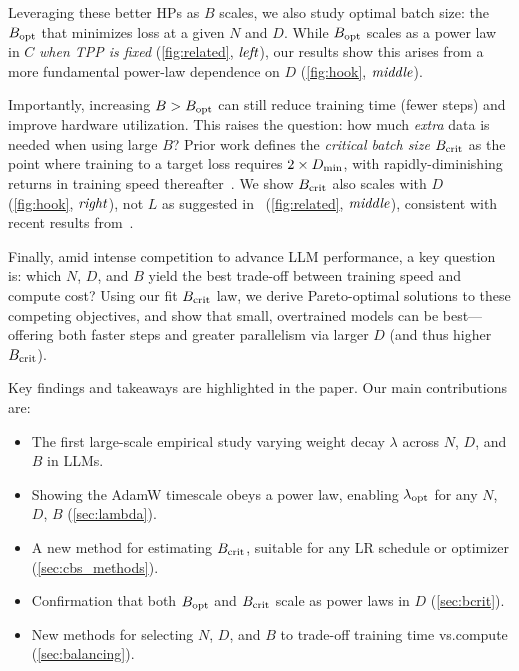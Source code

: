 Leveraging these better HPs as $B$ scales, we also study optimal batch
size: the $B_{\text{opt}}$ that minimizes loss at a given $N$ and $D$.
%
While $B_{\text{opt}}$ scales as a power law in $C$ \emph{when TPP is fixed}
(\cref{fig:related}, $\text{\emph{left}}$), our results show this arises from a
more fundamental power-law dependence on $D$ (\cref{fig:hook},
$\text{\emph{middle}}$).

Importantly, increasing $B > B_{\text{opt}}$ can still reduce training time
(fewer steps) and improve hardware utilization.
%
This raises the question: how much \emph{extra} data is needed when
using large $B$?
%
Prior work defines the \emph{critical batch size} $B_{\text{crit}}$ as the point
where training to a target loss requires $2 \times D_{\text{min}}$, with
rapidly-diminishing returns in training speed
thereafter~\citep{mccandlish2018empirical}.
%
We show $B_{\text{crit}}$ also scales with $D$ (\cref{fig:hook}, $\text{\emph{right}}$),
not $L$ as suggested in~\citet{kaplan2020scaling} (\cref{fig:related},
$\text{\emph{middle}}$), consistent with recent results
from~\citet{zhang2024how}.

Finally, amid intense competition to advance LLM performance, a key
question is: which $N$, $D$, and $B$ yield the best trade-off between
training speed and compute cost?
%
Using our fit $B_{\text{crit}}$ law, we derive Pareto-optimal solutions to these
competing objectives, and show that small, overtrained models can be
best---offering both faster steps and greater parallelism via larger
$D$ (and thus higher $B_{\text{crit}}$).

Key findings and takeaways are highlighted in the paper. Our main
contributions are:
\begin{itemize}[topsep=1pt,itemsep=1pt]
\item The first large-scale empirical study varying weight decay $\lambda$ across $N$, $D$, and $B$ in LLMs.
\item Showing the AdamW timescale obeys a power law, enabling $\lambda_{\text{opt}}$ for any $N$, $D$, $B$ (\cref{sec:lambda}).
\item A new method for estimating $B_{\text{crit}}$, suitable for any LR schedule or optimizer (\cref{sec:cbs_methods}).
\item Confirmation that both $B_{\text{opt}}$ and $B_{\text{crit}}$ scale as power laws in $D$ (\cref{sec:bcrit}).
\item New methods for selecting $N$, $D$, and $B$ to trade-off training time vs.\@ compute (\cref{sec:balancing}).
\end{itemize}
